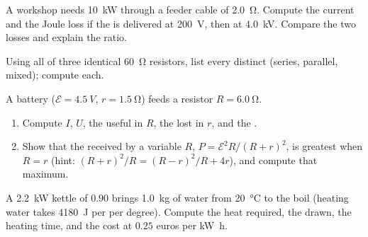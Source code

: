 \begin{exercise}[$\star\star$]\label{exo:g11:circuits-and-power:11}
A workshop needs \qty{10}{kW} through a feeder cable of 
\qty{2.0}{\ohm}. Compute the current and the Joule loss if the  is
delivered at \qty{200}{V}, then at \qty{4.0}{kV}. Compare the two losses
and explain the ratio.
\end{exercise}

\begin{exercise}[$\star\star\star$]\label{exo:g11:circuits-and-power:12}
Using all of three identical \qty{60}{\ohm} resistors, list every
distinct  (series, parallel, mixed); compute each.
\end{exercise}

\begin{exercise}[$\star\star\star$]\label{exo:g11:circuits-and-power:13}
A battery ($\mathcal{E} = \qty{4.5}{V}$, $r = \qty{1.5}{\ohm}$) feeds a
resistor $R = \qty{6.0}{\ohm}$.
\begin{enumerate}
  \item Compute $I$, $U$, the useful  in $R$, the  lost in $r$,
        and the .
  \item Show that the  received by a variable $R$,
        $P = \mathcal{E}^2 R/(R+r)^2$, is greatest when $R = r$ (hint:
        $(R+r)^2/R = (R-r)^2/R + 4r$), and compute that maximum.
\end{enumerate}
\end{exercise}

\begin{exercise}[$\star\star\star$]\label{exo:g11:circuits-and-power:14}
A \qty{2.2}{kW} kettle of  $0.90$ brings \qty{1.0}{kg} of water
from \qty{20}{\degreeCelsius} to the boil (heating water takes
\qty{4180}{J} per  per degree). Compute the heat required, the
 drawn, the heating time, and the cost at $0.25$ euros
per \unit{kW.h}.
\end{exercise}

